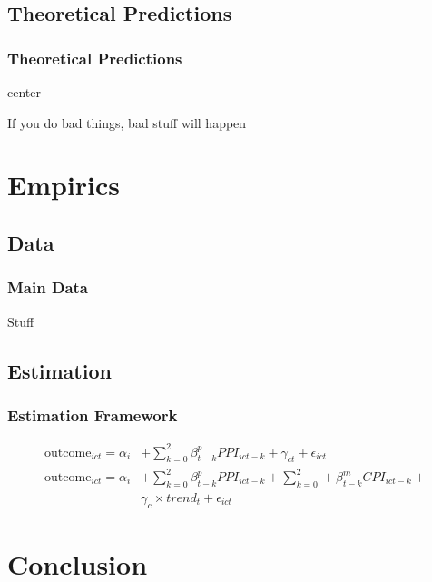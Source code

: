 \documentclass[aspectratio=169]{beamer}
\begin{document}
\subsection{Theoretical Predictions}
\begin{frame}[t]\frametitle{Theoretical Predictions}
\begin{center}
center
\end{center}

If you do bad things, bad stuff will happen

\end{frame}

\section{Empirics}
\tableofcontents[currentsection,subsubsectionstyle=hide]
\subsection{Data}
\begin{frame}\frametitle{Main Data}

Stuff

\end{frame}


\subsection{Estimation}
\begin{frame}\frametitle{Estimation Framework}

\begin{align*}
\text{outcome}_{ict} = \alpha_i & + \sum_{k=0}^2 \beta_{t-k}^p
PPI_{ict-k} + \gamma_{ct} + \epsilon_{ict} \\
\text{outcome}_{ict} = \alpha_i & + \sum_{k=0}^2 \beta_{t-k}^p PPI_{ict-k} +
\sum_{k=0}^2 + \beta_{t-k}^m CPI_{ict-k} + \\ & \gamma_{c}\times
trend_t + \epsilon_{ict}
\end{align*}

\end{frame}

\section{Conclusion}
\end{document}
